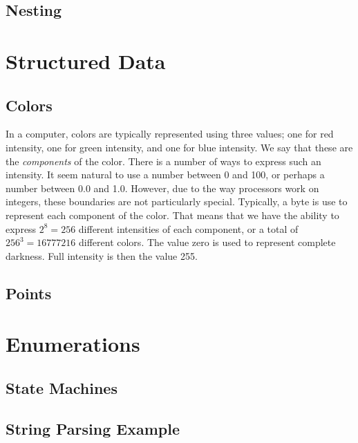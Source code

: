 \subsection{Nesting}

\section{Structured Data}

\subsection{Colors}

In a computer, colors are typically represented using three values; one for red intensity, one for green intensity, and one for blue intensity. We say that these are the \textsl{components} of the color. There is a number of ways to express such an intensity. It seem natural to use a number between 0 and 100, or perhaps a number between 0.0 and 1.0. However, due to the way processors work on integers, these boundaries are not particularly special. Typically, a byte is use to represent each component of the color. That means that we have the ability to express $2^8=256$ different intensities of each component, or a total of $256^3=16777216$ different colors. The value zero is used to represent complete darkness. Full intensity is then the value 255.



\subsection{Points}

\section{Enumerations}

\subsection{State Machines}

\subsection{String Parsing Example}

